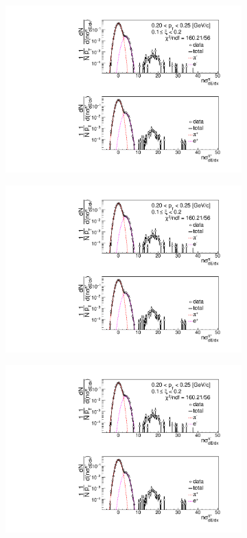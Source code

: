 \begin{figure}[h!]
\begin{subfigure}{.3\textwidth}
		\includegraphics[width=\linewidth, page=6]{chapters/chrgSTAR/img/dEdx/fit2019_secondStep_0_2.pdf}
	\end{subfigure}
	\begin{subfigure}{.33\textwidth}
		\includegraphics[width=\linewidth, page=7]{chapters/chrgSTAR/img/dEdx/fit2019_secondStep_0_2.pdf}
	\end{subfigure}
	\begin{subfigure}{.33\textwidth}
		\includegraphics[width=\linewidth, page=8]{chapters/chrgSTAR/img/dEdx/fit2019_secondStep_0_2.pdf}

\end{subfigure}
\end{figure}
